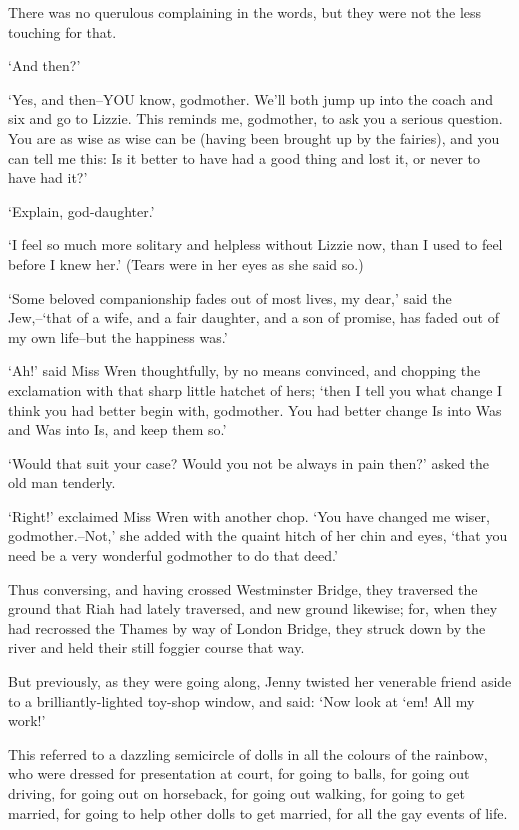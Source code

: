 There was no querulous complaining in the words, but they were not the
less touching for that.

‘And then?’

‘Yes, and then--YOU know, godmother. We’ll both jump up into the coach
and six and go to Lizzie. This reminds me, godmother, to ask you a
serious question. You are as wise as wise can be (having been brought
up by the fairies), and you can tell me this: Is it better to have had a
good thing and lost it, or never to have had it?’

‘Explain, god-daughter.’

‘I feel so much more solitary and helpless without Lizzie now, than I
used to feel before I knew her.’ (Tears were in her eyes as she said
so.)

‘Some beloved companionship fades out of most lives, my dear,’ said the
Jew,--‘that of a wife, and a fair daughter, and a son of promise, has
faded out of my own life--but the happiness was.’

‘Ah!’ said Miss Wren thoughtfully, by no means convinced, and chopping
the exclamation with that sharp little hatchet of hers; ‘then I tell you
what change I think you had better begin with, godmother. You had better
change Is into Was and Was into Is, and keep them so.’

‘Would that suit your case? Would you not be always in pain then?’ asked
the old man tenderly.

‘Right!’ exclaimed Miss Wren with another chop. ‘You have changed me
wiser, godmother.--Not,’ she added with the quaint hitch of her chin and
eyes, ‘that you need be a very wonderful godmother to do that deed.’

Thus conversing, and having crossed Westminster Bridge, they traversed
the ground that Riah had lately traversed, and new ground likewise; for,
when they had recrossed the Thames by way of London Bridge, they struck
down by the river and held their still foggier course that way.

But previously, as they were going along, Jenny twisted her venerable
friend aside to a brilliantly-lighted toy-shop window, and said: ‘Now
look at ‘em! All my work!’

This referred to a dazzling semicircle of dolls in all the colours of
the rainbow, who were dressed for presentation at court, for going to
balls, for going out driving, for going out on horseback, for going out
walking, for going to get married, for going to help other dolls to get
married, for all the gay events of life.

